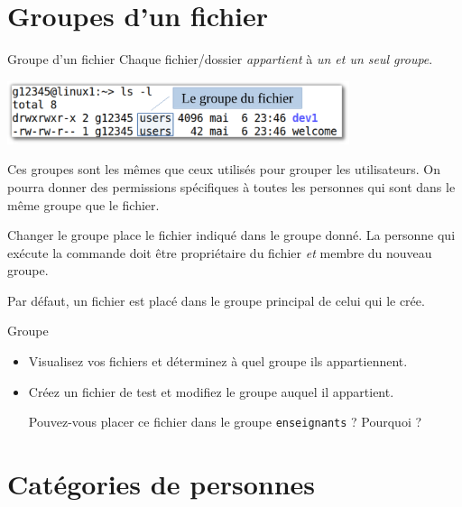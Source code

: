 \documentclass[a4paper,11pt]{style-esi/td}
\begin{document}
	\section{Groupes d'un fichier}

		\begin{theorie}{Groupe d'un fichier}
			Chaque fichier/dossier \emph{appartient} à \emph{un et un seul groupe}.
		\end{theorie}

		\begin{center}
			\includegraphics[height=5em]{image/group}
		\end{center}

		Ces groupes sont les mêmes que ceux utilisés pour grouper les utilisateurs.
		On pourra donner des permissions spécifiques à toutes les personnes
		qui sont dans le même groupe que le fichier.

		\begin{theorie}{Changer le groupe}
			place le fichier indiqué dans le groupe donné.
                        La personne qui exécute la commande doit être propriétaire du fichier \emph{et} membre du nouveau groupe.
		\end{theorie}

		Par défaut, un fichier est placé dans le groupe principal de celui qui le crée.

		\begin{Exercice}{Groupe}
			\vspace{-1em}
			\begin{itemize}
			\item Visualisez vos fichiers et déterminez à quel groupe ils appartiennent.
			\item Créez un fichier de test et modifiez le groupe auquel il appartient.
                          
                          Pouvez-vous placer ce fichier dans le groupe \texttt{enseignants} ? Pourquoi ?
			\end{itemize}
		\end{Exercice}

	\section{Catégories de personnes}
\end{document}
